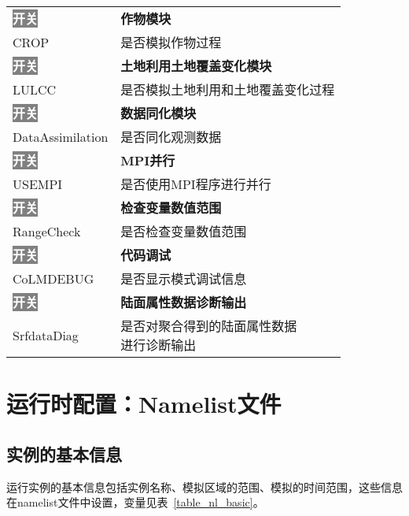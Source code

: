 \documentclass[a4paper,12pt,twoside]{article}
\begin{document}
\begin{longtable}{ll}
\hline
\colorbox{gray}{\textcolor{white}{\bf{开关}}} & \bf{作物模块} \\
CROP &  是否模拟作物过程 \\
\hline
\colorbox{gray}{\textcolor{white}{\bf{开关}}} & \bf{土地利用土地覆盖变化模块} \\
LULCC &  是否模拟土地利用和土地覆盖变化过程 \\
\hline
\colorbox{gray}{\textcolor{white}{\bf{开关}}} & \bf{数据同化模块} \\
DataAssimilation &  是否同化观测数据 \\
\hline
\colorbox{gray}{\textcolor{white}{\bf{开关}}} & \bf{MPI并行} \\
USEMPI &  是否使用MPI程序进行并行 \\
\hline
\colorbox{gray}{\textcolor{white}{\bf{开关}}} & \bf{检查变量数值范围} \\
RangeCheck &  是否检查变量数值范围 \\
\hline
\colorbox{gray}{\textcolor{white}{\bf{开关}}} & \bf{代码调试} \\
CoLMDEBUG &  是否显示模式调试信息 \\
\hline
\colorbox{gray}{\textcolor{white}{\bf{开关}}} & \bf{陆面属性数据诊断输出} \\
SrfdataDiag &  \makecell[l]{是否对聚合得到的陆面属性数据\\进行诊断输出} \\

\end{longtable}

\section{运行时配置：Namelist文件}\label{nml}

\subsection{实例的基本信息}
运行实例的基本信息包括实例名称、模拟区域的范围、模拟的时间范围，这些信息在namelist文件中设置，变量见表~\ref{table_nl_basic}。
\end{document}
